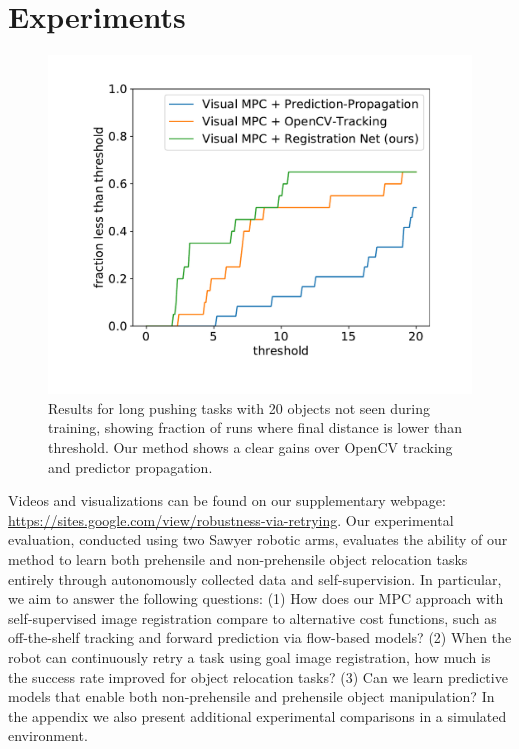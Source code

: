 
\vspace{-0.1cm}
\section{Experiments}
\vspace{-0.2cm}

\begin{figure}
\vspace{-0.3in}
\centering
\includegraphics[width=0.35\columnwidth]{images/pushlong_bench_same_range.pdf}
\vspace{-0.9cm}
\caption{\small{Results for long pushing tasks with 20 objects not seen during training, showing fraction of runs where final distance is lower than threshold. Our method shows a clear gains over OpenCV tracking and predictor propagation.}}
\label{fig:push_bench_long}
\vspace{-0.1in}
\end{figure}

Videos and visualizations can be found on our supplementary webpage: \url{https://sites.google.com/view/robustness-via-retrying}.
Our experimental evaluation, conducted using two Sawyer robotic arms, evaluates the ability of our method to learn both prehensile and non-prehensile object relocation tasks entirely through autonomously collected data and self-supervision. In particular, we aim to answer the following questions: (1) How does our MPC approach with self-supervised image registration compare to alternative cost functions, such as off-the-shelf tracking and forward prediction via flow-based models? (2) When the robot can continuously retry a task using goal image registration, how much is the success rate improved for object relocation tasks? (3) Can we learn predictive models that enable both non-prehensile and prehensile object manipulation? In the appendix we also present additional experimental comparisons in a simulated environment.


